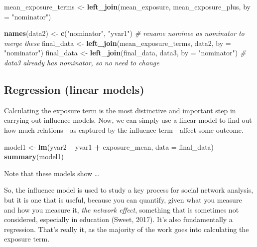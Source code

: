 \documentclass[]{book}
\newenvironment{Shaded}{\begin{snugshade}}{\end{snugshade}}
\newcommand{\KeywordTok}[1]{\textcolor[rgb]{0.13,0.29,0.53}{\textbf{#1}}}
\newcommand{\DataTypeTok}[1]{\textcolor[rgb]{0.13,0.29,0.53}{#1}}
\newcommand{\StringTok}[1]{\textcolor[rgb]{0.31,0.60,0.02}{#1}}
\newcommand{\CommentTok}[1]{\textcolor[rgb]{0.56,0.35,0.01}{\textit{#1}}}
\newcommand{\OperatorTok}[1]{\textcolor[rgb]{0.81,0.36,0.00}{\textbf{#1}}}
\newcommand{\NormalTok}[1]{#1}
\begin{document}
\begin{Shaded}
\begin{Highlighting}[]
\NormalTok{mean_exposure_terms <-}\StringTok{ }\KeywordTok{left_join}\NormalTok{(mean_exposure, mean_exposure_plus, }\DataTypeTok{by =} \StringTok{"nominator"}\NormalTok{)}

\KeywordTok{names}\NormalTok{(data2) <-}\StringTok{ }\KeywordTok{c}\NormalTok{(}\StringTok{"nominator"}\NormalTok{, }\StringTok{"yvar1"}\NormalTok{) }\CommentTok{# rename nominee as nominator to merge these}
\NormalTok{final_data <-}\StringTok{ }\KeywordTok{left_join}\NormalTok{(mean_exposure_terms, data2, }\DataTypeTok{by =} \StringTok{"nominator"}\NormalTok{)}
\NormalTok{final_data <-}\StringTok{ }\KeywordTok{left_join}\NormalTok{(final_data, data3, }\DataTypeTok{by =} \StringTok{"nominator"}\NormalTok{) }\CommentTok{# data3 already has nominator, so no need to change}
\end{Highlighting}
\end{Shaded}

\subsection{Regression (linear models)}\label{regression-linear-models}

Calculating the exposure term is the most distinctive and important step
in carrying out influence models. Now, we can simply use a linear model
to find out how much relations - as captured by the influence term -
affect some outcome.

\begin{Shaded}
\begin{Highlighting}[]
\NormalTok{model1 <-}\StringTok{ }\KeywordTok{lm}\NormalTok{(yvar2 }\OperatorTok{~}\StringTok{ }\NormalTok{yvar1 }\OperatorTok{+}\StringTok{ }\NormalTok{exposure_mean, }\DataTypeTok{data =}\NormalTok{ final_data)}
\KeywordTok{summary}\NormalTok{(model1)}
\end{Highlighting}
\end{Shaded}

Note that these models show \ldots{}

So, the influence model is used to study a key process for social
network analysis, but it is one that is useful, because you can
quantify, given what you measure and how you measure it, \emph{the
network effect}, something that is sometimes not considered, especially
in education (Sweet, 2017). It's also fundamentally a regression. That's
really it, as the majority of the work goes into calculating the
exposure term.
\end{document}
